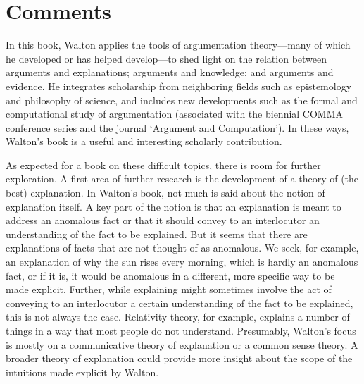 \documentclass[12pt,a4paper]{article}
\begin{document}
\section{Comments}
\label{comments}

\noindent %
In this book, Walton applies the tools of argumentation theory---many of which he developed or has helped develop---to shed light on 
the relation between arguments and explanations; arguments and knowledge;
and arguments and evidence. 
He integrates scholarship from neighboring fields such as epistemology and philosophy of science, and includes 
new developments such as the formal and computational study of argumentation (associated with the biennial COMMA conference series 
and the journal `Argument and Computation'). In these ways, Walton's book is a useful and interesting scholarly contribution.

As expected for a book on these difficult topics, there is room for further exploration. A first area of further research is the development of a theory of (the
best) explanation. In Walton's book, not much is said about the notion of
explanation itself. A key part of the notion is that an
explanation is meant to address an anomalous fact or that it should
convey to an interlocutor an understanding of the fact to be
explained. But it seems that there are explanations of facts that are not thought of as anomalous. We seek, for example, an
explanation of why the sun rises every morning, which is hardly an
anomalous fact, or if it is, it would be
anomalous in a different, more specific way to be made explicit. Further, while explaining might sometimes
involve the act of conveying to an interlocutor a certain
understanding of the fact to be explained, this is not always the
case. Relativity theory, for example, explains a number of things in a
way that most people do not understand. Presumably, Walton's focus is mostly on a
communicative theory of explanation or a common sense theory. A broader theory of explanation 
could provide more insight about the scope of the intuitions made explicit by Walton.
\end{document}
